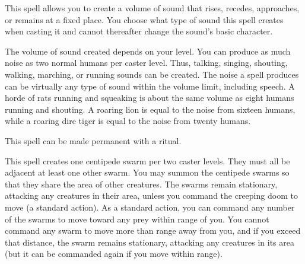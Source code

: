 \spellrng{\rngclose}
\begin{spelleffect}
  This spell allows you to create a volume of sound that rises, recedes, approaches, or remains at a fixed place. You choose what type of sound this spell creates when casting it and cannot thereafter change the sound's basic character.
  \par The volume of sound created depends on your level. You can produce as much noise as two normal humans per caster level. Thus, talking, singing, shouting, walking, marching, or running sounds can be created. The noise a  spell produces can be virtually any type of sound within the volume limit, including speech. A horde of rats running and squeaking is about the same volume as eight humans running and shouting. A roaring lion is equal to the noise from sixteen humans, while a roaring dire tiger is equal to the noise from twenty humans.
\end{spelleffect}
\begin{spellnotes}
This spell can be made permanent with a  ritual.
\end{spellnotes}

\spelldur{\durmed}
\begin{spelleffect}
  This spell creates one centipede swarm per two caster levels. They must all be adjacent at least one other swarm. You may summon the centipede swarms so that they share the area of other creatures. The swarms remain stationary, attacking any creatures in their area, unless you command the creeping doom to move (a standard action). As a standard action, you can command any number of the swarms to move toward any prey within \rngmed range of you. You cannot command any swarm to move more than \rngmed range away from you, and if you exceed that distance, the swarm remains stationary, attacking any creatures in its area (but it can be commanded again if you move within range).
\end{spelleffect}

